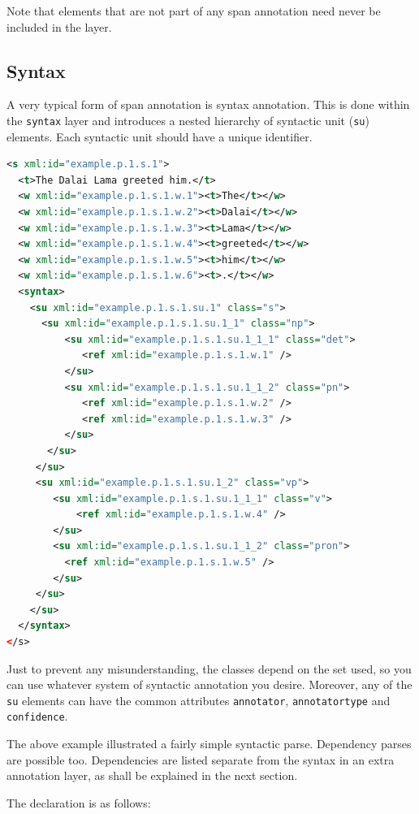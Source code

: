 \documentclass[a4paper,12pt]{report}
\begin{document}
Note that elements that are not part of any span annotation need never be included in the layer.

\subsection{Syntax}

A very typical form of span annotation is syntax annotation. This is done within the \texttt{syntax} layer and introduces a nested hierarchy of syntactic unit (\texttt{su}) elements. Each syntactic unit should have a unique identifier.

\begin{lstlisting}[language=xml]
<s xml:id="example.p.1.s.1">
  <t>The Dalai Lama greeted him.</t>
  <w xml:id="example.p.1.s.1.w.1"><t>The</t></w>
  <w xml:id="example.p.1.s.1.w.2"><t>Dalai</t></w>
  <w xml:id="example.p.1.s.1.w.3"><t>Lama</t></w>
  <w xml:id="example.p.1.s.1.w.4"><t>greeted</t></w>
  <w xml:id="example.p.1.s.1.w.5"><t>him</t></w>
  <w xml:id="example.p.1.s.1.w.6"><t>.</t></w>
  <syntax>
    <su xml:id="example.p.1.s.1.su.1" class="s">     
      <su xml:id="example.p.1.s.1.su.1_1" class="np">
          <su xml:id="example.p.1.s.1.su.1_1_1" class="det">
             <ref xml:id="example.p.1.s.1.w.1" />       
          </su>
          <su xml:id="example.p.1.s.1.su.1_1_2" class="pn">
             <ref xml:id="example.p.1.s.1.w.2" />
             <ref xml:id="example.p.1.s.1.w.3" />        
          </su>         
       </su>
     </su>
     <su xml:id="example.p.1.s.1.su.1_2" class="vp"> 
        <su xml:id="example.p.1.s.1.su.1_1_1" class="v">
            <ref xml:id="example.p.1.s.1.w.4" />       
        </su>
        <su xml:id="example.p.1.s.1.su.1_1_2" class="pron">
          <ref xml:id="example.p.1.s.1.w.5" />       
        </su>
     </su>    
    </su>
  </syntax>
</s>
\end{lstlisting}

Just to prevent any misunderstanding, the classes depend on the set used, so you can use whatever system of syntactic annotation you desire. Moreover, any of the \texttt{su} elements can have the common attributes \texttt{annotator}, \texttt{annotatortype} and \texttt{confidence}.


The above example illustrated a fairly simple syntactic parse. Dependency parses are possible too. Dependencies are listed separate from the syntax in an extra annotation layer, as shall be explained in the next section.

The declaration is as follows:
\end{document}
